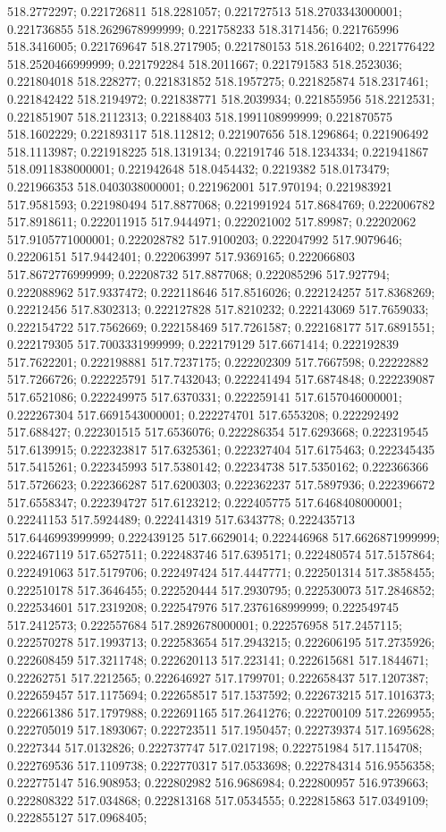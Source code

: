518.2772297; 0.221726811 518.2281057; 0.221727513 518.2703343000001; 0.221736855 518.2629678999999; 0.221758233 518.3171456; 0.221765996 518.3416005; 0.221769647 518.2717905; 0.221780153 518.2616402; 0.221776422 518.2520466999999; 0.221792284 518.2011667; 0.221791583 518.2523036; 0.221804018 518.228277; 0.221831852 518.1957275; 0.221825874 518.2317461; 0.221842422 518.2194972; 0.221838771 518.2039934; 0.221855956 518.2212531; 0.221851907 518.2112313; 0.22188403 518.1991108999999; 0.221870575 518.1602229; 0.221893117 518.112812; 0.221907656 518.1296864; 0.221906492 518.1113987; 0.221918225 518.1319134; 0.22191746 518.1234334; 0.221941867 518.0911838000001; 0.221942648 518.0454432; 0.2219382 518.0173479; 0.221966353 518.0403038000001; 0.221962001 517.970194; 0.221983921 517.9581593; 0.221980494 517.8877068; 0.221991924 517.8684769; 0.222006782 517.8918611; 0.222011915 517.9444971; 0.222021002 517.89987; 0.22202062 517.9105771000001; 0.222028782 517.9100203; 0.222047992 517.9079646; 0.22206151 517.9442401; 0.222063997 517.9369165; 0.222066803 517.8672776999999; 0.22208732 517.8877068; 0.222085296 517.927794; 0.222088962 517.9337472; 0.222118646 517.8516026; 0.222124257 517.8368269; 0.22212456 517.8302313; 0.222127828 517.8210232; 0.222143069 517.7659033; 0.222154722 517.7562669; 0.222158469 517.7261587; 0.222168177 517.6891551; 0.222179305 517.7003331999999; 0.222179129 517.6671414; 0.222192839 517.7622201; 0.222198881 517.7237175; 0.222202309 517.7667598; 0.22222882 517.7266726; 0.222225791 517.7432043; 0.222241494 517.6874848; 0.222239087 517.6521086; 0.222249975 517.6370331; 0.222259141 517.6157046000001; 0.222267304 517.6691543000001; 0.222274701 517.6553208; 0.222292492 517.688427; 0.222301515 517.6536076; 0.222286354 517.6293668; 0.222319545 517.6139915; 0.222323817 517.6325361; 0.222327404 517.6175463; 0.222345435 517.5415261; 0.222345993 517.5380142; 0.22234738 517.5350162; 0.222366366 517.5726623; 0.222366287 517.6200303; 0.222362237 517.5897936; 0.222396672 517.6558347; 0.222394727 517.6123212; 0.222405775 517.6468408000001; 0.22241153 517.5924489; 0.222414319 517.6343778; 0.222435713 517.6446993999999; 0.222439125 517.6629014; 0.222446968 517.6626871999999; 0.222467119 517.6527511; 0.222483746 517.6395171; 0.222480574 517.5157864; 0.222491063 517.5179706; 0.222497424 517.4447771; 0.222501314 517.3858455; 0.222510178 517.3646455; 0.222520444 517.2930795; 0.222530073 517.2846852; 0.222534601 517.2319208; 0.222547976 517.2376168999999; 0.222549745 517.2412573; 0.222557684 517.2892678000001; 0.222576958 517.2457115; 0.222570278 517.1993713; 0.222583654 517.2943215; 0.222606195 517.2735926; 0.222608459 517.3211748; 0.222620113 517.223141; 0.222615681 517.1844671; 0.22262751 517.2212565; 0.222646927 517.1799701; 0.222658437 517.1207387; 0.222659457 517.1175694; 0.222658517 517.1537592; 0.222673215 517.1016373; 0.222661386 517.1797988; 0.222691165 517.2641276; 0.222700109 517.2269955; 0.222705019 517.1893067; 0.222723511 517.1950457; 0.222739374 517.1695628; 0.2227344 517.0132826; 0.222737747 517.0217198; 0.222751984 517.1154708; 0.222769536 517.1109738; 0.222770317 517.0533698; 0.222784314 516.9556358; 0.222775147 516.908953; 0.222802982 516.9686984; 0.222800957 516.9739663; 0.222808322 517.034868; 0.222813168 517.0534555; 0.222815863 517.0349109; 0.222855127 517.0968405; 